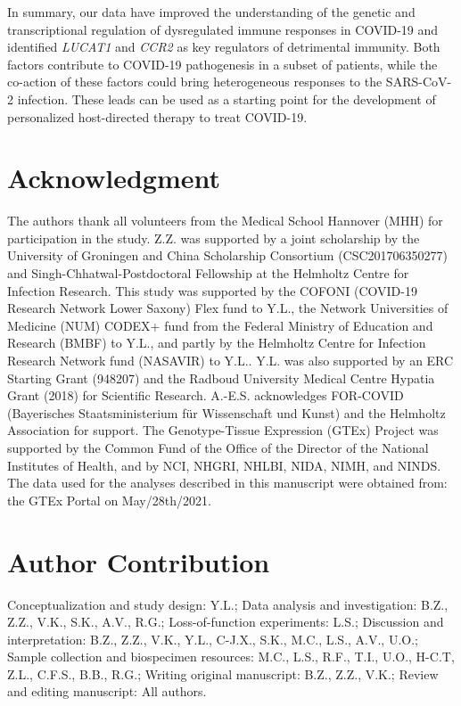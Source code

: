 \documentclass{book}
\begin{document}
\begin{refsection}
In summary, our data have improved the understanding of the genetic and transcriptional regulation of dysregulated immune responses in COVID-19 and identified \textit{LUCAT1} and \textit{CCR2} as key regulators of detrimental immunity.
Both factors contribute to COVID-19 pathogenesis in a subset of patients, while the co-action of these factors could bring heterogeneous responses to the SARS-CoV-2 infection.
These leads can be used as a starting point for the development of personalized host-directed therapy to treat COVID-19.

\section*{Acknowledgment}
The authors thank all volunteers from the Medical School Hannover (MHH) for participation in the study.
Z.Z. was supported by a joint scholarship by the University of Groningen and China Scholarship Consortium (CSC201706350277) and Singh-Chhatwal-Postdoctoral Fellowship at the Helmholtz Centre for Infection Research.
This study was supported by the COFONI (COVID-19 Research Network Lower Saxony) Flex fund to Y.L., the Network Universities of Medicine (NUM) CODEX+ fund from the Federal Ministry of Education and Research (BMBF) to Y.L., and partly by the Helmholtz Centre for Infection Research Network fund (NASAVIR) to Y.L..
Y.L. was also supported by an ERC Starting Grant (948207) and the Radboud University Medical Centre Hypatia Grant (2018) for Scientific Research.
A.-E.S. acknowledges FOR-COVID (Bayerisches Staatsministerium für Wissenschaft und Kunst) and the Helmholtz Association for support.
The Genotype-Tissue Expression (GTEx) Project was supported by the Common Fund of the Office of the Director of the National Institutes of Health, and by NCI, NHGRI, NHLBI, NIDA, NIMH, and NINDS.
The data used for the analyses described in this manuscript were obtained from: the GTEx Portal on May/28th/2021.
 
\section*{Author Contribution}
Conceptualization and study design: Y.L.;
Data analysis and investigation: B.Z., Z.Z., V.K., S.K., A.V., R.G.;
Loss-of-function experiments: L.S.;
Discussion and interpretation: B.Z., Z.Z., V.K., Y.L., C-J.X., S.K., M.C., L.S., A.V., U.O.;
Sample collection and biospecimen resources: M.C., L.S., R.F., T.I., U.O., H-C.T, Z.L., C.F.S., B.B., R.G.;
Writing original manuscript: B.Z., Z.Z., V.K.;
Review and editing manuscript: All authors.


\end{refsection}
\end{document}
